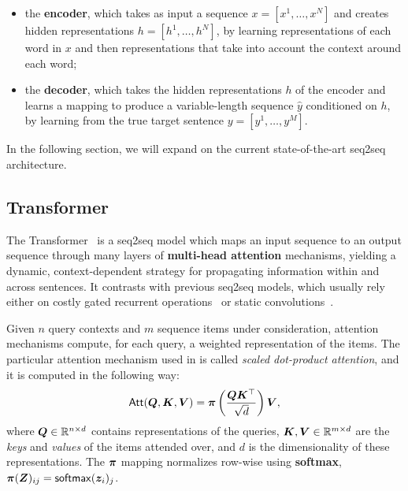 \begin{itemize}
    \item the {\bf encoder}, which takes as input a sequence $x=[x^1,
              \dots, x^N]$ and creates hidden representations $h=[h^1, \dots,
              h^N]$, by learning representations of each word in $x$ and then
          representations that take into account the context around each word;
    \item the {\bf decoder}, which takes the hidden representations
          $h$ of the encoder and learns a mapping to produce a
          variable-length sequence $\hat{y}$ conditioned on $h$, by
          learning from the true target sentence $y=[y^1, \dots, y^M]$.
\end{itemize}

In the following section, we will expand on the current
state-of-the-art seq2seq architecture.

\subsection{Transformer}

The Transformer~\citep{vaswani2017attention} is a seq2seq model which
maps an input sequence to an output sequence through many layers of
\textbf{multi-head attention} mechanisms, yielding a dynamic,
context-dependent strategy for propagating information within and
across sentences. It contrasts with previous seq2seq models, which
usually rely either on costly gated recurrent operations~\citep[often
    LSTMs:][]{bahdanau2014neural,luong2015effective} or static
convolutions~\citep{convseq}.

Given $n$ query contexts and $m$ sequence items under consideration,
attention mechanisms compute, for each query, a weighted
representation of the items. The particular attention mechanism used
in \citet{vaswani2017attention} is called \emph{scaled dot-product
    attention}, and it is computed in the following way:
%
\begin{equation}
    \operatorname{\mathsf{Att}}(\bm{Q}, \bm{K}, \bm{V}) = \bm{\pi}
    \left(\frac{\bm{Q}\bm{K}^\top}{\sqrt{d}}\right) \bm{V},
    \label{eq:att_scaled_dot}
\end{equation}
%
where $\bm{Q} \in \mathbb{R}^{n \times d}$ contains
representations of the queries, $\bm{K}, \bm{V} \in \mathbb{R}^{m \times
        d}$ are the \emph{keys} and \emph{values} of the items attended over,
and $d$ is the dimensionality of these representations. The $\bm{\pi}$
mapping normalizes row-wise using \textbf{softmax},
$\bm{\pi}(\bm{Z})_{ij} = \operatorname*{\mathsf{softmax}}(\bm{z}_i)_j$.

